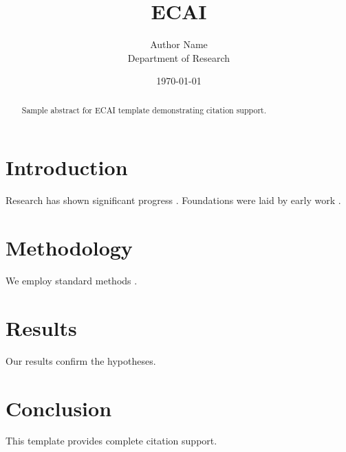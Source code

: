 \documentclass{article}
\title{ECAI}
\author{Author Name \\ \small Department of Research}
\date{\today}
\begin{document}
\maketitle

\begin{abstract}
Sample abstract for ECAI template demonstrating citation support.
\end{abstract}

\section{Introduction}
Research has shown significant progress \citep{einstein1905}. Foundations were laid by early work \citep{turing1950}.

\section{Methodology}
We employ standard methods \citep{knuth1984}.

\section{Results}
Our results confirm the hypotheses.

\section{Conclusion}
This template provides complete citation support.



\end{document}

